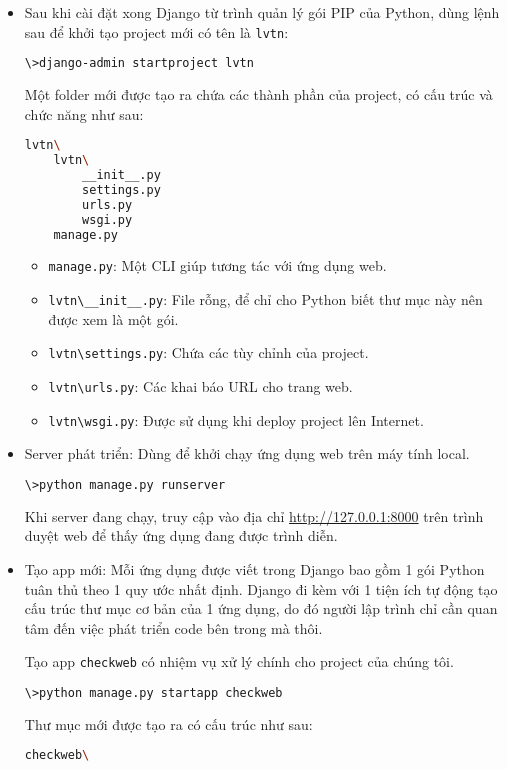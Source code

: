 \begin{itemize}
	\item Sau khi cài đặt xong Django từ trình quản lý gói PIP của Python, dùng lệnh sau để khởi tạo project mới có tên là \texttt{lvtn}:
	\begin{lstlisting}[language=bash]
\>django-admin startproject lvtn
	\end{lstlisting}
	Một folder mới được tạo ra chứa các thành phần của project, có cấu trúc và chức năng như sau:
	\begin{lstlisting}[language=bash]
lvtn\
	lvtn\
		__init__.py
		settings.py
		urls.py
		wsgi.py
	manage.py
	\end{lstlisting}
	\begin{itemize}
		\item \texttt{manage.py}: Một CLI giúp tương tác với ứng dụng web.
		\item \texttt{lvtn\textbackslash\_\_init\_\_.py}: File rỗng, để chỉ cho Python biết thư mục này nên được xem là một gói.
		\item \texttt{lvtn\textbackslash settings.py}: Chứa các tùy chỉnh của project.
		\item \texttt{lvtn\textbackslash urls.py}: Các khai báo URL cho trang web.
		\item \texttt{lvtn\textbackslash wsgi.py}: Được sử dụng khi deploy project lên Internet.
	\end{itemize}
	\item Server phát triển: Dùng để khởi chạy ứng dụng web trên máy tính local.
	\begin{lstlisting}[language=bash]
\>python manage.py runserver
	\end{lstlisting}
	Khi server đang chạy, truy cập vào địa chỉ \url{http://127.0.0.1:8000} trên trình duyệt web để thấy ứng dụng đang được trình diễn.
	\item Tạo app mới: Mỗi ứng dụng được viết trong Django bao gồm 1 gói Python tuân thủ theo 1 quy ước nhất định. Django đi kèm với 1 tiện ích tự động tạo cấu trúc thư mục cơ bản của 1 ứng dụng, do đó người lập trình chỉ cần quan tâm đến việc phát triển code bên trong mà thôi.
	\par
	Tạo app \texttt{checkweb}	có nhiệm vụ xử lý chính cho project của chúng tôi.
	\begin{lstlisting}[language=bash]
\>python manage.py startapp checkweb
	\end{lstlisting}
	Thư mục mới được tạo ra có cấu trúc như sau:
	\begin{lstlisting}[language=bash]
checkweb\

\end{lstlisting}
\end{itemize}
